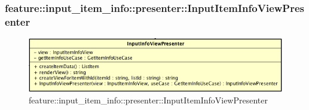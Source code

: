 \subsubsection{feature::input\_item\_info::presenter::InputItemInfoViewPresenter}

\label{feature::input\_item\_info::presenter::InputItemInfoViewPresenter}
\begin{figure}[ht]
	\centering
	\includegraphics[scale=0.5]{Sezioni/SottosezioniST/img/app/InputInfoViewPresenter.png}
	\caption{feature::input\_item\_info::presenter::InputItemInfoViewPresenter}
\end{figure}


